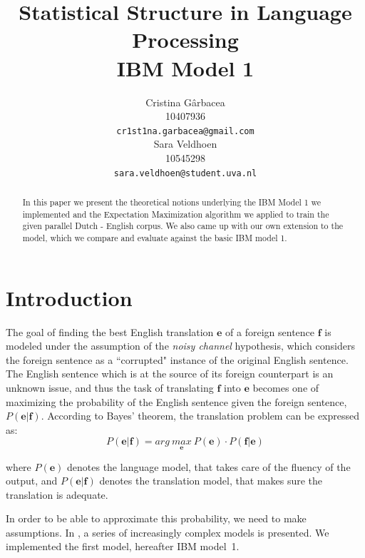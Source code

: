 \documentclass[11pt]{article}
\title{Statistical Structure in Language Processing \\ IBM Model 1}
\author{ Cristina G\^arbacea\\
  10407936 \\
  {\small \tt cr1st1na.garbacea@gmail.com} 
  \\\And
  Sara Veldhoen \\
10545298   \\
  {\small \tt sara.veldhoen@student.uva.nl} \\}
\date{}
\renewcommand{\vec}[1]{\mathbf{#1}}
\begin{document}
\maketitle

\begin{abstract}
In this paper we present the theoretical notions underlying the IBM Model 1 we implemented and the Expectation Maximization algorithm we applied to train the given parallel Dutch - English corpus. 
We also came up with our own extension to the model, which we compare and evaluate against the basic IBM model 1. 
\end{abstract}

\section{Introduction}
The goal of finding the best English translation $\vec{e}$ of a foreign sentence $\vec{f}$ is modeled under the assumption of the \textit{noisy channel} hypothesis, which considers the foreign sentence as a ``corrupted" instance of the original English sentence. The English sentence which is at the source of its foreign counterpart is an unknown issue, and thus the task of translating $\vec{f}$ into $\vec{e}$ becomes one of maximizing the probability of the English sentence given the foreign sentence, $P(\vec{e}|\vec{f})$. According to Bayes' theorem, 
%
%
the translation problem can be expressed as:
\begin{equation}
P(\vec{e}|\vec{f})= arg \ \underset{\vec{e}}{max} \ P(\vec{e})\cdot P(\vec{f}|\vec{e})
\end{equation}

where $P(\vec{e})$ denotes the language model, that takes care of the fluency of the output, 
 and $P(\vec{e}|\vec{f})$ denotes the translation model, that makes sure the translation is adequate. 

In order to be able to approximate this probability, we need to make assumptions. In %
\cite{Koehn:2010}, \cite{Brown:2010} a series of increasingly complex models is presented. We implemented the first model, hereafter IBM model~1. 
\end{document}
